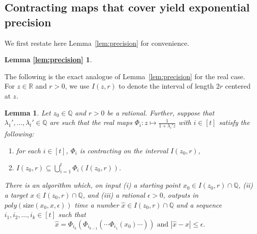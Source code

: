 \documentclass[11pt]{article}
\newtheorem{lemma}[theorem]{Lemma}
\newtheorem*{lemprecision}{Lemma \ref{lem:precision}}
\def\Reals{\mathbb{R}}
\newcommand{\size}[1]{\mathrm{size}(#1)}
\newcommand{\eps}{\epsilon}
\begin{document}
\subsection{Contracting maps that cover yield exponential precision}\label{sec:mainidea}
We first restate here Lemma~\ref{lem:precision} for convenience.
\begin{lemprecision}
\statelemprecision
\end{lemprecision}
The following is the exact analogue of Lemma~\ref{lem:precision} for the real case. For $z\in \Reals$ and $r>0$, we use $I(z,r)$ to denote the interval of length $2r$ centered at $z$.
\begin{lemma}\label{lem:precisionreals}
Let $z_0\in \mathbb{Q}$ and $r>0$ be a rational. Further, suppose that   $\lambda_1',\hdots,\lambda_t'\in \mathbb{Q}$ are such that the real maps $\Phi_i:z\mapsto \frac{1}{1+\lambda_i' z}$ with $i\in[t]$ satisfy the following:
\begin{enumerate}
\item for each $i\in[t]$, $\Phi_i$ is contracting on  the interval $I(z_0,r)$,
\item $I(z_0,r)\subseteq \bigcup^{t}_{i=1}\Phi_i(I(z_0,r))$.
\end{enumerate}



There is an algorithm which, on input (i) a starting point $x_0\in I(z_0,r)\cap \mathbb{Q}$, (ii) a target $x\in I(z_0,r)\cap \mathbb{Q}$,  and (iii) a rational $\epsilon>0$, outputs in $poly(\size{x_0,x,\eps})$ time a number $\hat{x}\in I(z_0,r)\cap \mathbb{Q}$ and  a sequence $i_1,i_2,\hdots,i_k\in [t]$ such that  
\[\hat{x}=\Phi_{i_k}(\Phi_{i_{k-1}}(\cdots\Phi_{i_1}(x_0)\cdots))\mbox{ and }|\hat{x}-x|\leq \epsilon.\]
\end{lemma}
\end{document}
